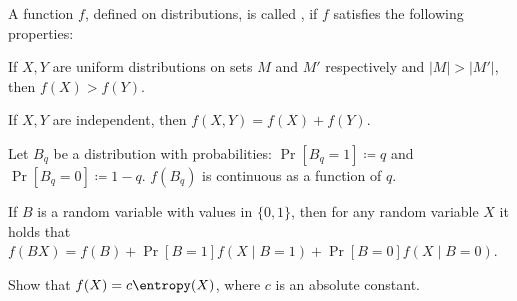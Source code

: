 A function $f$, defined on distributions, is called , if $f$
satisfies the following properties:
\begin{enumtask}
    \item If $X, Y$ are uniform distributions on sets $M$ and $M'$ respectively and $|M| > |M'|$, then
        $f(X) > f(Y)$.
    \item If $X, Y$ are independent, then $f(X, Y) = f(X) + f(Y)$.
    \item Let $B_q$ be a distribution with probabilities: $\Pr[B_q = 1] \coloneqq q$ and $\Pr[B_q = 0]
        \coloneqq 1 - q$. $f(B_q)$ is continuous as a function of $q$.
    \item If $B$ is a random variable with values in $\{0, 1\}$, then for any random variable $X$ it
        holds that $f(BX) = f(B) + \Pr[B = 1] f(X \mid B = 1) + \Pr[B = 0] f(X \mid B = 0)$.
\end{enumtask}

Show that $f(X) = c \entropy(X)$, where $c$ is an absolute constant.
